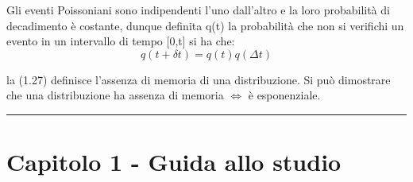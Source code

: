 Gli eventi Poissoniani sono indipendenti l'uno dall'altro e la loro probabilit\`{a} di decadimento \`{e} costante, dunque definita q(t) la probabilit\`{a} che non si verifichi un evento in un intervallo di tempo [0,t] si ha che: 
\begin{equation}
	q(t + \delta t) = q(t)q(\Delta t)	
\end{equation}

 la (1.27) definisce l'assenza di memoria di una distribuzione. Si pu\`{o} dimostrare che una distribuzione ha assenza di memoria $\iff$ \`{e} esponenziale.
\vspace{0.05cm}
\par\noindent\rule{\textwidth}{2pt}

\section{Capitolo 1 - Guida allo studio}

